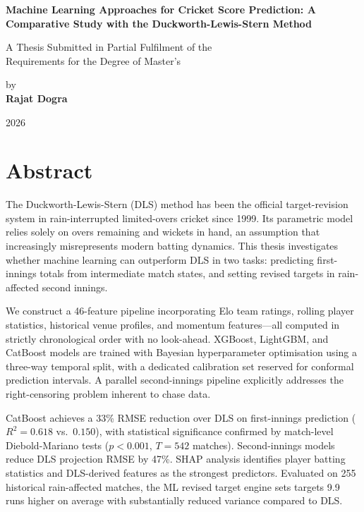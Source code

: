 \documentclass[12pt,a4paper,oneside]{report}
\begin{document}
\begin{titlepage}
\centering
\vspace*{2cm}

{\LARGE\bfseries Machine Learning Approaches for Cricket Score Prediction: A Comparative Study with the Duckworth-Lewis-Stern Method}

\vspace{2cm}

{\Large A Thesis Submitted in Partial Fulfilment of the\\
Requirements for the Degree of Master's}

\vspace{2cm}

{\Large by\\[0.5cm]
\textbf{Rajat Dogra}}

\vspace{3cm}

{\large 2026}

\vfill
\end{titlepage}

\chapter*{Abstract}

The Duckworth-Lewis-Stern (DLS) method has been the official target-revision system in rain-interrupted limited-overs cricket since 1999. Its parametric model relies solely on overs remaining and wickets in hand, an assumption that increasingly misrepresents modern batting dynamics. This thesis investigates whether machine learning can outperform DLS in two tasks: predicting first-innings totals from intermediate match states, and setting revised targets in rain-affected second innings.

We construct a 46-feature pipeline incorporating Elo team ratings, rolling player statistics, historical venue profiles, and momentum features---all computed in strictly chronological order with no look-ahead. XGBoost, LightGBM, and CatBoost models are trained with Bayesian hyperparameter optimisation using a three-way temporal split, with a dedicated calibration set reserved for conformal prediction intervals. A parallel second-innings pipeline explicitly addresses the right-censoring problem inherent to chase data.

CatBoost achieves a 33\% RMSE reduction over DLS on first-innings prediction ($R^2 = 0.618$ vs.\ $0.150$), with statistical significance confirmed by match-level Diebold-Mariano tests ($p < 0.001$, $T = 542$ matches). Second-innings models reduce DLS projection RMSE by 47\%. SHAP analysis identifies player batting statistics and DLS-derived features as the strongest predictors. Evaluated on 255 historical rain-affected matches, the ML revised target engine sets targets 9.9 runs higher on average with substantially reduced variance compared to DLS.
\end{document}
